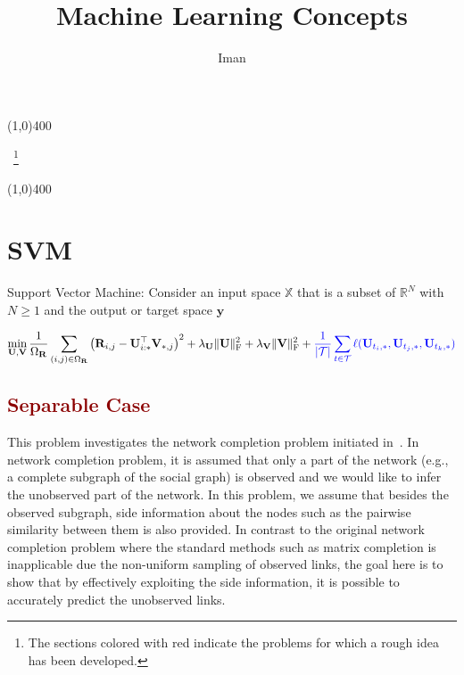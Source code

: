 \documentclass[11pt]{article}
\date{}
\title{Machine Learning Concepts}
\author{Iman}
\def\doubleline{
    \linethickness{0.5mm}
    \vspace{-0.9em}
    \hspace{\fill}\line(1,0){400}\hspace{\fill}


}
\newcommand{\cT}{\mathcal{T}}
\newcommand{\bR}{\mathbf{R}}
\newcommand{\bU}{\mathbf{U}}
\newcommand{\bV}{\mathbf{V}}
\theoremstyle{definition}
\begin{document}
\maketitle


\vspace{1cm}
\begin{center}
	\doubleline
\end{center}

\tableofcontents~\footnote{The sections colored with red indicate the problems for which a rough idea has been developed.}

\vspace{1cm}
\begin{center}
	\doubleline
\end{center}


\newpage

\section{SVM}
Support Vector Machine: Consider an input space $\mathbb{X}$ that is a subset of $\mathbb{R}^N$ with $N\geq 1$ and the output or target space $\mathbf{y}$
 
 
 
 \[ \min_{\bU, \bV} \frac{1}{\Omega_{\bR}} \sum_{(i, j) \in \Omega_{\bR}}^{}{\left(\bR_{i,j}-\bU_{i:*}^{\top}\bV_{*,j}\right)^2} + \lambda_{\bU} \|\bU\|_{\text{F}}^2+ \lambda_{\bV} \|\bV\|_{\text{F}}^2 + \textcolor{blue}{\frac{1}{|\cT|}\sum_{t \in \cT}^{}{\ell(\bU_{t_i,*}, \bU_{t_j,*},\bU_{t_k,*} })}\]


\subsection{\textcolor{DarkRed}{Separable Case}}


This problem investigates the network completion problem initiated in~\cite{kim2011network}. In network completion problem, it is assumed that only a part of the network (e.g., a complete subgraph of the social graph) is observed and we would like to infer the unobserved part of the network. In this problem, we assume that besides the observed subgraph, side information about the nodes such as the pairwise similarity between them is also provided. In contrast to the original network completion problem where the standard methods such as matrix completion is inapplicable due the non-uniform sampling of observed links,  the goal here is to show that by effectively exploiting the side information, it is possible to accurately  predict the unobserved links.  
\end{document}
